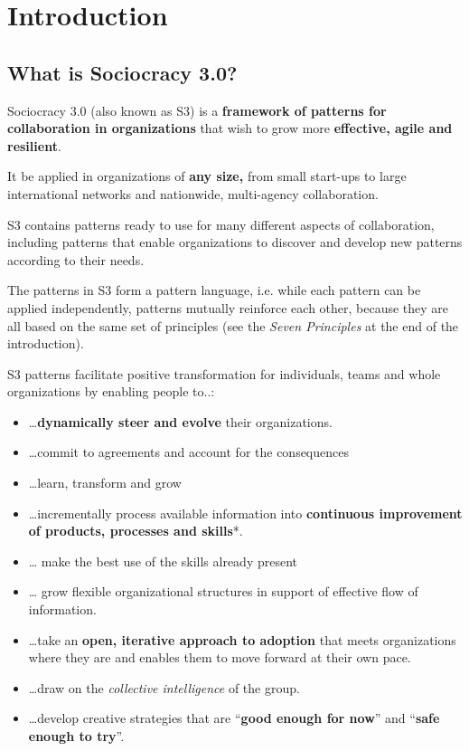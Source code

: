 \part{Introduction}
\label{introduction}

\chapter{What is Sociocracy 3.0?}
\label{whatissociocracy3.0}

Sociocracy 3.0 (also known as S3) is a \textbf{framework of patterns for collaboration in organizations} that wish to grow more \textbf{effective, agile and resilient}.

It be applied in organizations of \textbf{any size,} from small start-ups to large international networks and nationwide, multi-agency collaboration.

S3 contains patterns ready to use for many different aspects of collaboration, including patterns that enable organizations to discover and develop new patterns according to their needs.

The patterns in S3 form a pattern language, i.e. while each pattern can be applied independently, patterns mutually reinforce each other, because they are all based on the same set of principles (see the \emph{Seven Principles} at the end of the introduction).

S3 patterns facilitate positive transformation for individuals, teams and whole organizations by enabling people to..:

\begin{itemize}
\item {\ldots}\textbf{dynamically steer and evolve} their organizations.

\item {\ldots}commit to agreements and account for the consequences

\item {\ldots}learn, transform and grow

\item {\ldots}incrementally process available information into \textbf{continuous improvement of products, processes and skills}*.

\item {\ldots} make the best use of the skills already present

\item {\ldots} grow flexible organizational structures in support of effective flow of information.

\item {\ldots}take an \textbf{open, iterative approach to adoption} that meets organizations where they are and enables them to move forward at their own pace.

\item {\ldots}draw on the \emph{collective intelligence} of the group.

\item {\ldots}develop creative strategies that are “\textbf{good enough for now}” and “\textbf{safe enough to try}”.

\end{itemize}

